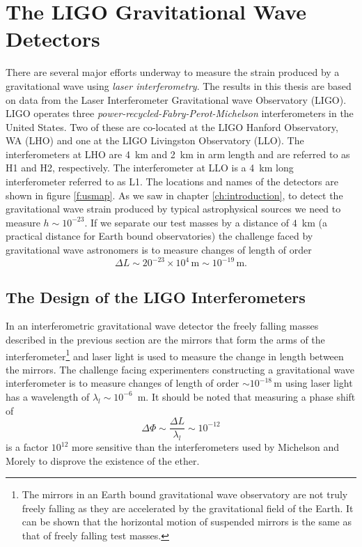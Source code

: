 \section{The LIGO Gravitational Wave Detectors}
\label{s:ifos}

There are several major efforts
underway\cite{Barish:1999,Acernese:2002,Luck:1997hv} to measure the strain
produced by a gravitational wave using \emph{laser interferometry}. The
results in this thesis are based on data from the Laser Interferometer
Gravitational wave Observatory (LIGO). LIGO operates three
\emph{power-recycled-Fabry-Perot-Michelson} interferometers in the United
States. Two of these are co-located at the LIGO Hanford Observatory, WA (LHO)
and one at the LIGO Livingston Observatory (LLO). The interferometers at LHO
are 4~km and 2~km in arm length and are referred to as H1 and H2,
respectively. The interferometer at LLO is a 4~km long interferometer referred
to as L1. The locations and names of the detectors are shown in figure
\ref{f:usmap}.  As we saw in chapter \ref{ch:introduction}, to detect the
gravitational wave strain produced by typical astrophysical sources we need to
measure $h \sim 10^{-23}$. If we separate our test masses by a distance of
$4$~km (a practical distance for Earth bound observatories) the challenge
faced by gravitational wave astronomers is to measure changes of length of
order
\begin{equation}
\Delta L \sim 20^{-23} \times 10^4\,\mathrm{m} \sim 10^{-19}\,\mathrm{m}.
\end{equation}

\subsection{The Design of the LIGO Interferometers}
\label{ss:ligoifos}

In an interferometric gravitational wave detector the freely falling masses
described in the previous section are the mirrors that form the arms of the
interferometer\footnote{The mirrors in an Earth bound gravitational wave
observatory are not truly freely falling as they are accelerated by the
gravitational field of the Earth. It can be shown that the horizontal motion
of suspended mirrors is the same as that of freely falling test masses.} and
laser light is used to measure the change in length between the mirrors.  The
challenge facing experimenters constructing a gravitational wave
interferometer is to measure changes of length of order $\sim
10^{-18}\,\mathrm{m}$ using laser light has a wavelength of $\lambda_l \sim
10^{-6}$~m.  It should be noted that measuring a phase shift of
\begin{equation}
\Delta \Phi \sim \frac{\Delta L}{\lambda_l} \sim 10^{-12}
\end{equation}
is a factor $10^{12}$ more sensitive than the interferometers used by
Michelson and Morely to disprove the existence of the ether.

